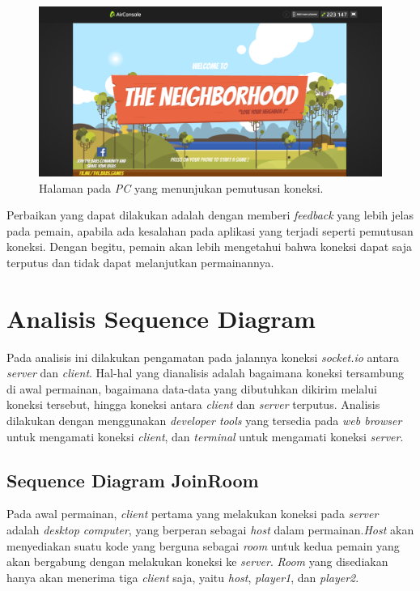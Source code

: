 \begin{figure}[H]
	\centering
	\includegraphics[scale=0.3]{Gambar/con9_play7}
	\caption{Halaman pada \textit{PC} yang menunjukan pemutusan koneksi.}
	\label{fig:29_con9_play7}
\end{figure}

Perbaikan yang dapat dilakukan adalah dengan memberi \textit{feedback} yang lebih jelas pada pemain, apabila ada kesalahan pada aplikasi yang terjadi seperti pemutusan koneksi. Dengan begitu, pemain akan lebih mengetahui bahwa koneksi dapat saja terputus dan tidak dapat melanjutkan permainannya.

\section{Analisis Sequence Diagram}
\label{sequence}

Pada analisis ini dilakukan pengamatan pada jalannya koneksi \textit{socket.io} antara \textit{server} dan \textit{client}. Hal-hal yang dianalisis adalah bagaimana koneksi tersambung di awal permainan, bagaimana data-data yang dibutuhkan dikirim melalui koneksi tersebut, hingga koneksi antara \textit{client} dan \textit{server} terputus. Analisis dilakukan dengan menggunakan \textit{developer tools} yang tersedia pada \textit{web browser} untuk mengamati koneksi \textit{client}, dan \textit{terminal} untuk mengamati koneksi \textit{server}.

\subsection{Sequence Diagram JoinRoom}



Pada awal permainan, \textit{client} pertama yang melakukan koneksi pada \textit{server} adalah \textit{desktop computer}, yang berperan sebagai \textit{host} dalam permainan.\textit{Host} akan menyediakan suatu kode yang berguna sebagai \textit{room} untuk kedua pemain yang akan bergabung dengan melakukan koneksi ke \textit{server}. \textit{Room} yang disediakan hanya akan menerima tiga \textit{client} saja, yaitu \textit{host}, \textit{player1}, dan \textit{player2}. 

